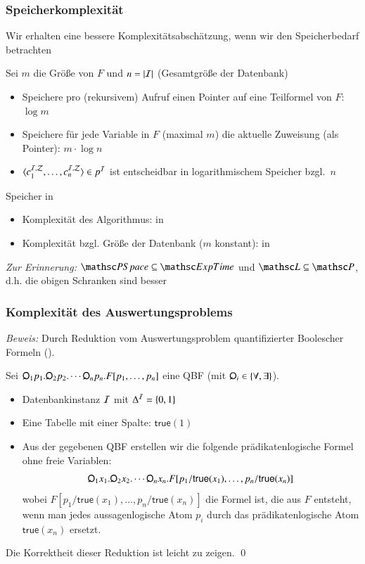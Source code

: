 \documentclass[aspectratio=1610,onlymath]{beamer}
\begin{document}
\begin{frame}\frametitle{Speicherkomplexität}

Wir erhalten eine bessere Komplexitätsabschätzung, wenn wir den Speicherbedarf
betrachten
\bigskip

Sei $m$ die Größe von $F$ und $n=|\mathcal{I}|$ (Gesamtgröße der Datenbank)
\bigskip

\begin{itemize}
\item Speichere pro (rekursivem) Aufruf einen Pointer auf eine Teilformel von $F$: $\log m$
\item Speichere für jede Variable in $F$ (maximal $m$) die aktuelle Zuweisung (als Pointer): $m\cdot\log n$
\item $\langle{c_1^{\mathcal{I},\mathcal{Z}},\ldots,c_n^{\mathcal{I},\mathcal{Z}}}\rangle\in p^{\mathcal{I}}$ ist entscheidbar in logarithmischem Speicher bzgl.\ $n$
\end{itemize}
\bigskip\pause

Speicher in 
\begin{itemize}
\item Komplexität des Algorithmus: \alert{in \PSpace}
\item Komplexität bzgl. Größe der Datenbank ($m$ konstant): \alert{in \LogSpace}
\end{itemize}

{\tiny\emph{Zur Erinnerung:} $\PSpace\subseteq\ExpTime$ und $\LogSpace\subseteq\PTime$, d.h. die obigen Schranken sind besser}

\end{frame}

\begin{frame}\frametitle{Komplexität des Auswertungsproblems}

\pause

\emph{Beweis:} Durch Reduktion vom Auswertungsproblem quantifizierter Boolescher Formeln ().\medskip

Sei $\quantor_1 p_1. \quantor_2 p_2. \cdots \quantor_n p_n.F[p_1,\ldots,p_n]$ eine QBF (mit $\quantor_i\in\{\forall,\exists\}$).\pause
\begin{itemize}
\item Datenbankinstanz $\mathcal{I}$ mit $\Delta^{\mathcal{I}}=\{0,1\}$
\item Eine Tabelle mit einer Spalte: $\textsf{true}(1)$
\item Aus der gegebenen QBF erstellen wir die folgende prädikatenlogische Formel ohne freie Variablen:
\[\quantor_1 x_1. \quantor_2 x_2. \cdots \quantor_n x_n.F[p_1/\textsf{true}(x_1),\ldots,p_n/\textsf{true}(x_n)]\]
wobei $F[p_1/\textsf{true}(x_1),\ldots,p_n/\textsf{true}(x_n)]$ die Formel ist, die aus $F$ entsteht, wenn man jedes aussagenlogische Atom $p_i$ durch das prädikatenlogische Atom
$\textsf{true}(x_n)$ ersetzt.
\end{itemize}
Die Korrektheit dieser Reduktion ist leicht zu zeigen. \qed

\end{frame}
\end{document}
